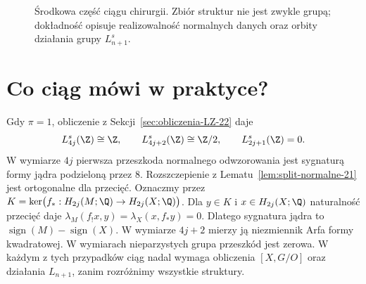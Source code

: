 \begin{figure}[htbp]
\centering
{}
\caption{Środkowa część ciągu chirurgii.
Zbiór struktur nie jest zwykle grupą; dokładność
opisuje realizowalność normalnych danych oraz
orbity działania grupy $L_{n+1}^s$.}
\label{fig:exact-surgery-23}
\end{figure}

\section{Co ciąg mówi w praktyce?}
\label{sec:applications-surgery-23}

\begin{przyklad}
\label{prz:simply-connected-surgery-23}
Gdy $\pi=1$, obliczenie z
Sekcji~\ref{sec:obliczenia-LZ-22} daje
\[
 L_{4j}^s(\Z)\cong\Z,\qquad
 L_{4j+2}^s(\Z)\cong\Z/2,\qquad
 L_{2j+1}^s(\Z)=0.
\]
W wymiarze $4j$ pierwsza przeszkoda
normalnego odwzorowania jest sygnaturą
formy jądra podzieloną przez $8$.
Rozszczepienie z
Lematu~\ref{lem:split-normalne-21}
jest ortogonalne dla przecięć. Oznaczmy przez
$K=\ker\bigl(f_*:H_{2j}(M;\Q)\to
H_{2j}(X;\Q)\bigr)$. Dla $y\in K$
i $x\in H_{2j}(X;\Q)$
naturalność przecięć daje
$\lambda_M(f_!x,y)=\lambda_X(x,f_*y)=0$.
Dlatego sygnatura jądra to
$\operatorname{sign}(M)-\operatorname{sign}(X)$.
W wymiarze $4j+2$ mierzy ją
niezmiennik Arfa formy kwadratowej.
W wymiarach nieparzystych grupa przeszkód
jest zerowa. W każdym z tych przypadków
ciąg nadal wymaga obliczenia $[X,G/O]$
oraz działania $L_{n+1}$, zanim
rozróżnimy wszystkie struktury.
\end{przyklad}

